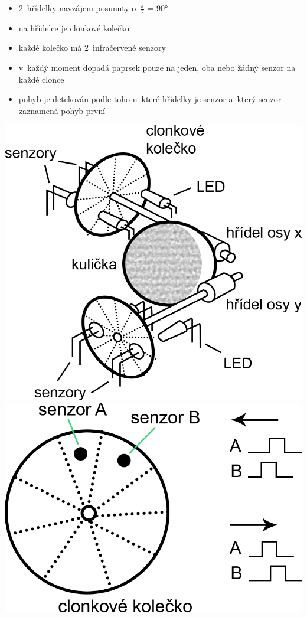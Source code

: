 \documentclass[a4paper,12pt]{article}
\providecommand{\tightlist}{%
\setlength{\itemsep}{0pt}\setlength{\parskip}{0pt}}
\begin{document}
\begin{itemize}
\tightlist
\item 2~hřídelky navzájem posunuty o~$\frac{\pi}{2}$ = 90°
\item na hřídelce je clonkové kolečko
\item každé kolečko má 2~infračervené senzory
\item v~každý moment dopadá paprsek pouze na jeden, oba nebo žádný senzor na každé clonce
\item pohyb je detekován podle toho u~které hřídelky je senzor a~který senzor
zaznamená pohyb první
\end{itemize}
\includegraphics{ref/kulickova-mys.png}
\hspace{2cm}
\includegraphics{ref/kulickova-mys-senzory.png}
\end{document}
